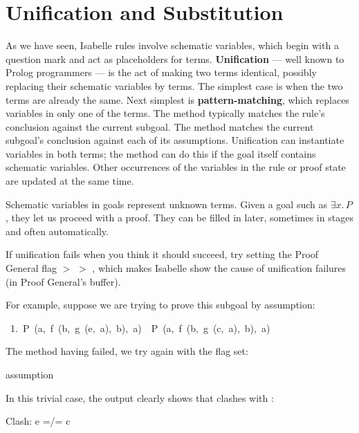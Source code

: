 \section{Unification and Substitution}\label{sec:unification}

%
As we have seen, Isabelle rules involve schematic variables, which begin with
a question mark and act as
placeholders for terms.  \textbf{Unification} --- well known to Prolog programmers --- is the act of
making two terms identical, possibly replacing their schematic variables by
terms.  The simplest case is when the two terms are already the same. Next
simplest is \textbf{pattern-matching}, which replaces variables in only one of the
terms.  The
 method typically  matches the rule's conclusion
against the current subgoal.  The
 method matches the current subgoal's conclusion
against each of its assumptions.   Unification can instantiate variables in both terms; the  method can do this if the goal
itself contains schematic variables.  Other occurrences of the variables in
the rule or proof state are updated at the same time.

Schematic variables in goals represent unknown terms.  Given a goal such
as $\exists x.\,P$, they let us proceed with a proof.  They can be 
filled in later, sometimes in stages and often automatically. 

\begin{pgnote}
If unification fails when you think it should succeed, try setting the Proof General flag  $>$  $>$
,
which makes Isabelle show the cause of unification failures (in Proof
General's  buffer).
\end{pgnote}
\noindent
For example, suppose we are trying to prove this subgoal by assumption:
\begin{isabelle}
\ 1.\ P\ (a,\ f\ (b,\ g\ (e,\ a),\ b),\ a)\ \isasymLongrightarrow \ P\ (a,\ f\ (b,\ g\ (c,\ a),\ b),\ a)
\end{isabelle}
The  method having failed, we try again with the flag set:
\begin{isabelle}
 assumption
\end{isabelle}
In this trivial case, the output clearly shows that  clashes with :
\begin{isabelle}
Clash: e =/= c
\end{isabelle}

